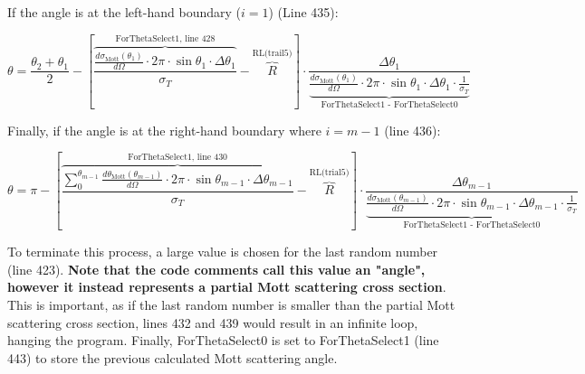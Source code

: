 \documentclass[10pt, reqno]{exam}
\begin{document}
If the angle is at the left-hand boundary ($i = 1$) (Line 435):

\begin{equation}
    \theta = \frac{\theta_2 + \theta_1}{2} - \left[ \overbrace{\boxed{\frac{\frac{d\sigma_{\text{Mott}}(\theta_1)}{d\Omega}\cdot 2\pi\cdot \sin\theta_1\cdot \Delta \theta_ 1}{\sigma_T}}}^{\text{ForThetaSelect1, line 428}} - \overbrace{\boxed{R}}^{\text{RL(trail5)}}\right]\cdot \frac{\Delta\theta_1}{\underbrace{\boxed{\frac{d\sigma_{\text{Mott}}(\theta_1)}{d\Omega}\cdot 2\pi\cdot \sin\theta_{1}\cdot \Delta \theta_1\cdot \frac{1}{\sigma_T}}}_{\text{ForThetaSelect1 - ForThetaSelect0}}}
\end{equation}

Finally, if the angle is at the right-hand boundary where $i = m - 1$ (line 436):

\begin{equation}
    \theta = \pi - \left[ \overbrace{\boxed{\frac{\sum_0^{\theta_{m-1}}\frac{d\theta_{\text{Mott}}(\theta_{m -1})}{d\Omega}\cdot 2\pi\cdot \sin\theta_{m - 1}\cdot \Delta \theta_{m-1}}{\sigma_T}}}^{\text{ForThetaSelect1, line 430}} - \overbrace{\boxed{R}}^{\text{RL(trial5)}} \right] \cdot \frac{\Delta \theta_{m-1}}{\underbrace{\boxed{\frac{d\sigma_{\text{Mott}}(\theta_{m-1})}{d\Omega}\cdot 2\pi \cdot \sin\theta_{m - 1}\cdot \Delta \theta_{m-1}\cdot \frac{1}{\sigma_T}}}_{\text{ForThetaSelect1 - ForThetaSelect0}}}
\end{equation}

To terminate this process, a large value is chosen for the last random number (line 423). \textbf{Note that the code comments call this value an "angle", however it instead represents a partial Mott scattering cross section}. This is important, as if the last random number is smaller than the partial Mott scattering cross section, lines 432 and 439 would result in an infinite loop, hanging the program. Finally, ForThetaSelect0 is set to ForThetaSelect1 (line 443) to store the previous calculated Mott scattering angle. 
\end{document}
